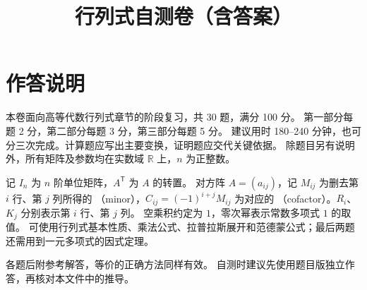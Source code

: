 \documentclass[UTF8,12pt,a4paper,fontset=fandol]{ctexart}
\title{行列式自测卷（含答案）}
\author{}
\date{}
\begin{document}
\maketitle

\section*{作答说明}
本卷面向高等代数行列式章节的阶段复习，共 30 题，满分 100 分。
第一部分每题 2 分，第二部分每题 3 分，第三部分每题 5 分。
建议用时 180--240 分钟，也可分三次完成。计算题应写出主要变换，证明题应交代关键依据。
除题目另有说明外，所有矩阵及参数均在实数域 $\mathbb R$ 上，$n$ 为正整数。

记 $I_n$ 为 $n$ 阶单位矩阵，$A^{\mathsf T}$ 为 $A$ 的转置。
对方阵 $A=(a_{ij})$，记 $M_{ij}$ 为删去第 $i$ 行、第 $j$ 列所得的
（minor），$C_{ij}=(-1)^{i+j}M_{ij}$ 为对应的
（cofactor）。$R_i$、$K_j$ 分别表示第 $i$ 行、第 $j$ 列。
空乘积约定为 $1$，零次幂表示常数多项式 $1$ 的取值。
可使用行列式基本性质、乘法公式、拉普拉斯展开和范德蒙公式；最后两题还需用到一元多项式的因式定理。

各题后附参考解答，等价的正确方法同样有效。
自测时建议先使用题目版独立作答，再核对本文件中的推导。
\end{document}
